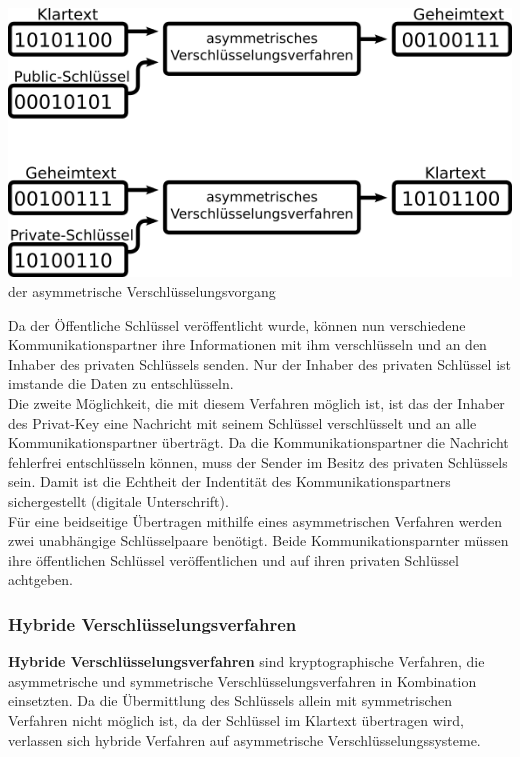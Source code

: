 \documentclass[12pt,a4paper]{report}
\begin{document}
\begin{center}
\includegraphics[scale=3]{img/asym.png}\\
der asymmetrische Verschlüsselungsvorgang
\end{center}

Da der Öffentliche Schlüssel veröffentlicht wurde, können nun verschiedene Kommunikationspartner ihre Informationen mit ihm verschlüsseln und an den Inhaber des privaten Schlüssels senden. Nur der Inhaber des privaten Schlüssel ist imstande die Daten zu entschlüsseln.\\
Die zweite Möglichkeit, die mit diesem Verfahren möglich ist, ist das der Inhaber des Privat-Key eine Nachricht mit seinem Schlüssel verschlüsselt und an alle Kommunikationspartner überträgt. Da die Kommunikationspartner die Nachricht fehlerfrei entschlüsseln können, muss der Sender im Besitz des privaten Schlüssels sein. Damit ist die Echtheit der Indentität des Kommunikationspartners sichergestellt (digitale Unterschrift).\\
Für eine beidseitige Übertragen mithilfe eines asymmetrischen Verfahren werden zwei unabhängige Schlüsselpaare benötigt. Beide Kommunikationsparnter müssen ihre öffentlichen Schlüssel veröffentlichen und auf ihren privaten Schlüssel achtgeben.

\subsubsection{Hybride Verschlüsselungsverfahren}

\textbf{Hybride Verschlüsselungsverfahren} sind kryptographische Verfahren, die asymmetrische und symmetrische Verschlüsselungsverfahren in Kombination einsetzten. Da die Übermittlung des Schlüssels allein mit symmetrischen Verfahren nicht möglich ist, da der Schlüssel im Klartext übertragen wird, verlassen sich hybride Verfahren auf asymmetrische Verschlüsselungssysteme.
\end{document}
